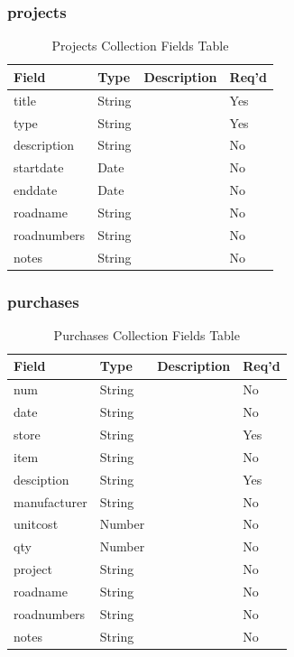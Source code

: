 \subsubsection{projects}
\begin{table}[H]
    \begin{tabular}{|L{3cm}|L{1.7cm}|L{8.8cm}|L{1.3cm}|}
    \hline
        \textbf{Field} & \textbf{Type} & \textbf{Description} & \textbf{Req'd} \\ \hline
	title & String &  & Yes \\ \hline
	type & String &  & Yes \\ \hline
	description & String &  & No \\ \hline
	startdate & Date &  & No \\ \hline
	enddate & Date &  & No \\ \hline
	roadname & String &  & No \\ \hline
	roadnumbers & String &  & No \\ \hline
	notes & String &  & No \\ \hline
    \end{tabular}
    \caption{\label{project-table}Projects Collection Fields Table}
    \end{table}
\subsubsection{purchases}
\begin{table}[H]
    \begin{tabular}{|L{3cm}|L{1.7cm}|L{8.8cm}|L{1.3cm}|}
    \hline
        \textbf{Field} & \textbf{Type} & \textbf{Description} & \textbf{Req'd} \\ \hline
	num & String &  & No \\ \hline
	date & String &  & No \\ \hline
	store & String &  & Yes \\ \hline
	item & String &  & No \\ \hline
	desciption & String &  & Yes \\ \hline
	manufacturer & String &  & No \\ \hline
	unitcost & Number &  & No \\ \hline
	qty & Number &  & No \\ \hline
	project & String &  & No \\ \hline
	roadname & String &  & No \\ \hline
	roadnumbers & String &  & No \\ \hline
	notes & String &  & No \\ \hline
    \end{tabular}
    \caption{\label{purchase-table}Purchases Collection Fields Table}
    \end{table}
